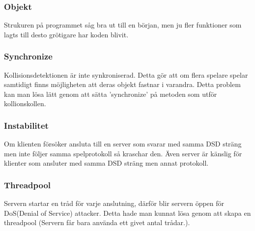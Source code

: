 \documentclass[10pt, titlepage, oneside, a4paper]{article}
\begin{document}
		\subsubsection{Objekt} Strukuren på programmet såg bra ut till en början, men ju fler funktioner som lagts till desto grötigare har koden blivit. 
		\subsubsection{Synchronize} Kollisionsdetektionen är inte synkroniserad. Detta gör att om flera spelare spelar samtidigt finns möjligheten att deras objekt fastnar i varandra. Detta problem kan man lösa lätt genom att sätta 'synchronize' på metoden som utför kollionskollen.
		\subsubsection{Instabilitet} Om klienten försöker ansluta till en server som svarar med samma DSD sträng men inte följer samma spelprotokoll så kraschar den. Även server är känslig för klienter som ansluter med samma DSD sträng men annat protokoll.
		\subsubsection{Threadpool} Servern startar en tråd för varje anslutning, därför blir servern öppen för DoS(Denial of Service) attacker. Detta hade man kunnat lösa genom att skapa en threadpool (Servern får bara använda ett givet antal trådar.).
    
    
\end{document}
